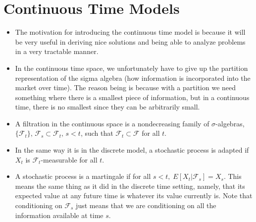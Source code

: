 \documentclass[11pt]{article}
\begin{document}
\section{Continuous Time Models}

\begin{itemize}
    \item The motivation for introducing the continuous time model is because it will be very 
    useful in deriving nice solutions and being able to analyze problems in a very tractable 
    manner. 
    \item In the continuous time space, we unfortunately have to give up the partition 
    representation of the sigma algebra (how information is incorporated into the market over 
    time). The reason being is because with a partition we need something where there is a 
    smallest piece of information, but in a continuous time, there is no smallest since they
    can be arbitrarily small. 
    \item A filtration in the continuous space is a nondecreasing family of $\sigma$-algebras,
    $\{\mathcal{F}_t\}, \, \mathcal{F}_s \subset \mathcal{F}_t, \, s < t$, such that 
    $\mathcal{F}_t \subset \mathcal{F}$ for all $t$.
    \item In the same way it is in the discrete model, a stochastic process is adapted if 
    $X_t$ is $\mathcal{F}_t$-measurable for all $t$.
    \item A stochastic process is a martingale if for all $s<t, \; E[X_t|\mathcal{F}_s]=X_s$.
    This means the same thing as it did in the discrete time setting, namely, that its 
    expected value at any future time is whatever its value currently is.  Note that 
    conditioning on $\mathcal{F}_s$ just means that we are conditioning on all the information 
    available at time $s$.
\end{itemize}
\end{document}
